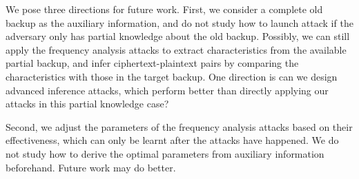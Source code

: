 \documentclass[bachelor]{thesis-uestc}
\begin{document}
 We pose three directions for future work. First, we consider a complete old backup as the auxiliary information, and do not study how to launch attack if the adversary only has partial knowledge about the old backup. Possibly, we can still apply the frequency analysis attacks to extract characteristics from the available partial backup, and infer ciphertext-plaintext pairs by comparing the characteristics with those in the target backup. One direction is can we design advanced inference attacks, which  perform better than directly applying our attacks in this partial knowledge case?  
 
 
 Second, we adjust the parameters of the frequency analysis attacks based on their effectiveness, which can only be learnt after the attacks have happened. We do not study how to derive the optimal parameters from auxiliary information beforehand. Future work may do better. 
 
 
 
\end{document}
